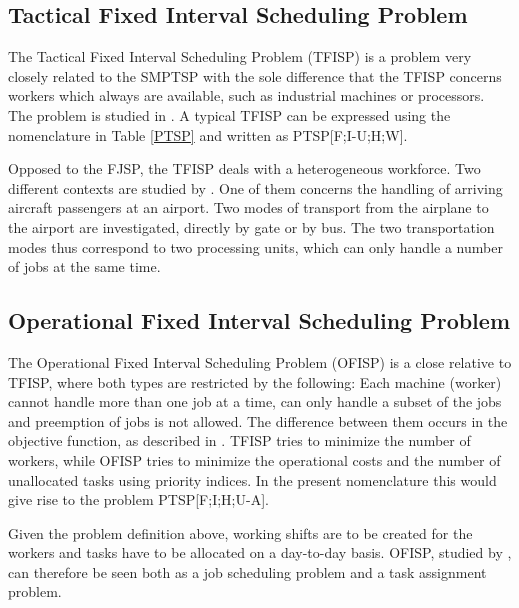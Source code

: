 \subsection{Tactical Fixed Interval Scheduling Problem} \label{TFISP}
The Tactical Fixed Interval Scheduling Problem (TFISP) is a problem very closely related to the SMPTSP with the sole difference that the TFISP concerns workers which always are available, such as industrial machines or processors. The problem is studied in \citet{kroon_1995}. A typical TFISP can be expressed using the nomenclature in Table \ref{PTSP} and written as PTSP[F;I-U;H;W].

Opposed to the FJSP, the TFISP deals with a heterogeneous workforce. Two different contexts are studied by \citet{kroon_1995}. One of them concerns the handling of arriving aircraft passengers at an airport. Two modes of transport from the airplane to the airport are investigated, directly by gate or by bus. The two transportation modes thus correspond to two processing units, which can only handle a number of jobs at the same time.

\subsection{Operational Fixed Interval Scheduling Problem}
The Operational Fixed Interval Scheduling Problem (OFISP) is a close relative to TFISP, where both types are restricted by the following: Each machine (worker) cannot handle more than one job at a time, can only handle a subset of the jobs and preemption of jobs is not allowed. The difference between them occurs in the objective function, as described in \citet{kroon_1995}. TFISP tries to minimize the number of workers, while OFISP tries to minimize the operational costs and the number of unallocated tasks using priority indices. In the present nomenclature this would give rise to the problem PTSP[F;I;H;U-A].

Given the problem definition above, working shifts are to be created for the workers and tasks have to be allocated on a day-to-day basis. OFISP, studied by \citet{kroon_1995}, can therefore be seen both as a job scheduling problem and a task assignment problem.



%



